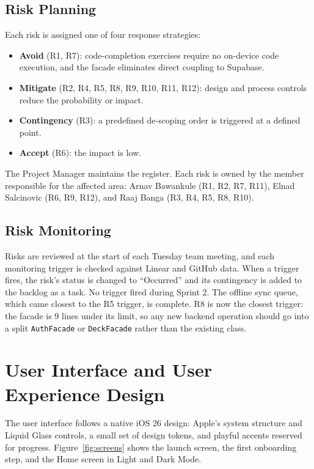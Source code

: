 \documentclass[12pt,letterpaper]{article}
\begin{document}
\subsection{Risk Planning}
Each risk is assigned one of four response strategies:
\begin{itemize}
  \item \textbf{Avoid} (R1, R7): code-completion exercises require no on-device code
        execution, and the facade eliminates direct coupling to Supabase.
  \item \textbf{Mitigate} (R2, R4, R5, R8, R9, R10, R11, R12): design and process
        controls reduce the probability or impact.
  \item \textbf{Contingency} (R3): a predefined de-scoping order is triggered at a
        defined point.
  \item \textbf{Accept} (R6): the impact is low.
\end{itemize}
The Project Manager maintains the register. Each risk is owned by the member
responsible for the affected area: Arnav Bawankule (R1, R2, R7, R11), Elnad
Salcinovic (R6, R9, R12), and Raaj Banga (R3, R4, R5, R8, R10).

\subsection{Risk Monitoring}
Risks are reviewed at the start of each Tuesday team meeting, and each monitoring
trigger is checked against Linear and GitHub data. When a trigger fires, the risk's
status is changed to ``Occurred'' and its contingency is added to the backlog as a
task. No trigger fired during Sprint 2. The offline sync queue, which came closest to
the R5 trigger, is complete. R8 is now the closest trigger: the facade is
9 lines under its limit, so any new backend operation should go into a split
\texttt{AuthFacade} or \texttt{DeckFacade} rather than the existing class.

\section{User Interface and User Experience Design}\label{sec:ui}
The user interface follows a native iOS 26 design: Apple's system
structure and Liquid Glass controls, a small set of design tokens, and playful accents
reserved for progress. Figure~\ref{fig:screens} shows the launch screen, the first
onboarding step, and the Home screen in Light and Dark Mode.
\end{document}
